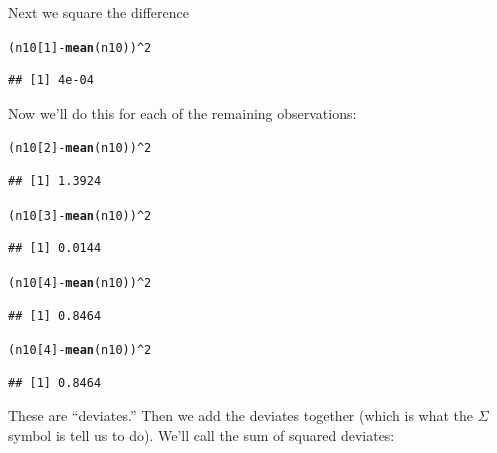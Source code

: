 \documentclass{tufte-handout}\usepackage[]{graphicx}\usepackage[]{color}
\makeatletter
\newcommand{\hlnum}[1]{\textcolor[rgb]{0.686,0.059,0.569}{#1}}%
\newcommand{\hlopt}[1]{\textcolor[rgb]{0,0,0}{#1}}%
\newcommand{\hlstd}[1]{\textcolor[rgb]{0.345,0.345,0.345}{#1}}%
\newcommand{\hlkwd}[1]{\textcolor[rgb]{0.737,0.353,0.396}{\textbf{#1}}}%
\newenvironment{kframe}{%
 \def\at@end@of@kframe{}%
 \ifinner\ifhmode%
  \def\at@end@of@kframe{\end{minipage}}%
  \begin{minipage}{\columnwidth}%
 \fi\fi%
 \def\FrameCommand##1{\hskip\@totalleftmargin \hskip-\fboxsep
 \colorbox{shadecolor}{##1}\hskip-\fboxsep
     \hskip-\linewidth \hskip-\@totalleftmargin \hskip\columnwidth}%
 \MakeFramed {\advance\hsize-\width
   \@totalleftmargin\z@ \linewidth\hsize
   \@setminipage}}%
 {\par\unskip\endMakeFramed%
 \at@end@of@kframe}
\newenvironment{knitrout}{}{} %
\makeatother
\begin{document}
Next we square the difference
\begin{knitrout}
\color{fgcolor}\begin{kframe}
\begin{alltt}
\hlstd{(n10[}\hlnum{1}\hlstd{]} \hlopt{-} \hlkwd{mean}\hlstd{(n10))}\hlopt{^}\hlnum{2}
\end{alltt}
\begin{verbatim}
## [1] 4e-04
\end{verbatim}
\end{kframe}
\end{knitrout}
\noindent Now we'll do this for each of the remaining observations:
\begin{knitrout}
\color{fgcolor}\begin{kframe}
\begin{alltt}
\hlstd{(n10[}\hlnum{2}\hlstd{]} \hlopt{-} \hlkwd{mean}\hlstd{(n10))}\hlopt{^}\hlnum{2}
\end{alltt}
\begin{verbatim}
## [1] 1.3924
\end{verbatim}
\begin{alltt}
\hlstd{(n10[}\hlnum{3}\hlstd{]} \hlopt{-} \hlkwd{mean}\hlstd{(n10))}\hlopt{^}\hlnum{2}
\end{alltt}
\begin{verbatim}
## [1] 0.0144
\end{verbatim}
\begin{alltt}
\hlstd{(n10[}\hlnum{4}\hlstd{]} \hlopt{-} \hlkwd{mean}\hlstd{(n10))}\hlopt{^}\hlnum{2}
\end{alltt}
\begin{verbatim}
## [1] 0.8464
\end{verbatim}
\begin{alltt}
\hlstd{(n10[}\hlnum{4}\hlstd{]} \hlopt{-} \hlkwd{mean}\hlstd{(n10))}\hlopt{^}\hlnum{2}
\end{alltt}
\begin{verbatim}
## [1] 0.8464
\end{verbatim}
\end{kframe}
\end{knitrout}
These are ``deviates.'' Then we add the deviates together (which is what the $\Sigma$ symbol is tell us to do). We'll call the sum of squared deviates:
\end{document}

